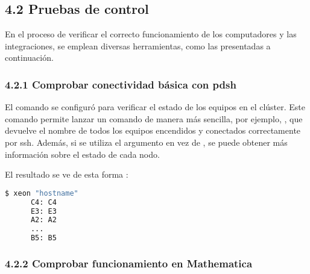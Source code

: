 \begin{spacing}{1.5}
  \subsection{4.2 Pruebas de control}

  En el proceso de verificar el correcto funcionamiento de los computadores y las integraciones, se emplean diversas herramientas, como las presentadas a continuación.

  \subsubsection {4.2.1 Comprobar conectividad básica con pdsh}

  El comando  se configuró para verificar el estado de los equipos
  en
  el clúster. Este comando permite lanzar un comando de manera más sencilla,
  por
  ejemplo, , que devuelve el nombre de
  todos los
  equipos encendidos y conectados correctamente por ssh. Además, si se utiliza
  el
  argumento  en vez de , se puede obtener más
  información sobre el estado de cada nodo.

  El resultado se ve de esta forma :


  \begin{lstlisting}[language=Bash]
      $ xeon "hostname"
      C4: C4
      E3: E3
      A2: A2
      ...
      B5: B5
  \end{lstlisting}

  \subsubsection{4.2.2 Comprobar funcionamiento en Mathematica}


\end{spacing}
